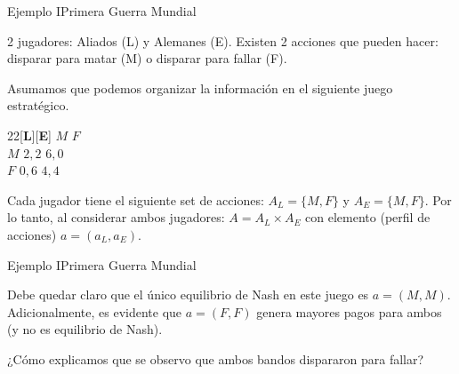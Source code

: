\documentclass[notes, 11pt]{beamer} %
\newenvironment{wideitemize}{\itemize\addtolength{\itemsep}{10pt}}{\enditemize}
\begin{document}
\begin{frame}{Ejemplo I}{Primera Guerra Mundial}
	\begin{wideitemize}
		\item<1-> 2 jugadores: Aliados (L) y Alemanes (E). Existen 2 acciones que pueden hacer: disparar para matar (M) o disparar para fallar (F).
		\item<2-> Asumamos que podemos organizar la informaci\'on en el siguiente juego estrat\'egico.

		\begin{center}
			 \begin{game}{2}{2}[\textbf{L}][\textbf{E}]
                  \>$M$         \>$F$\\
        $M$       \>$2,2$       \>$6,0$\\
        $F$       \>$0,6$       \>$4,4$
        	 \end{game}
        \end{center}

        \item<3-> Cada jugador tiene el siguiente set de acciones: $A_{L} = \{ M, F \}$ y $A_{E} = \{ M, F \}$. Por lo tanto, al considerar ambos jugadores: $A = A_{L} \times A_{E}$ con elemento (perfil de acciones) $a = (a_{L}, a_{E})$.
	\end{wideitemize}
\end{frame}

\begin{frame}{Ejemplo I}{Primera Guerra Mundial}
	\begin{wideitemize}
        \item<1-> Debe quedar claro que el \'unico equilibrio de Nash en este juego es $a = (M,M)$. Adicionalmente, es evidente que $a = (F,F)$ genera mayores pagos para ambos (y no es equilibrio de Nash).

        \item<2-> ¿C\'omo explicamos que se observo que ambos bandos dispararon para fallar?
	\end{wideitemize}
\end{frame}
\end{document}
